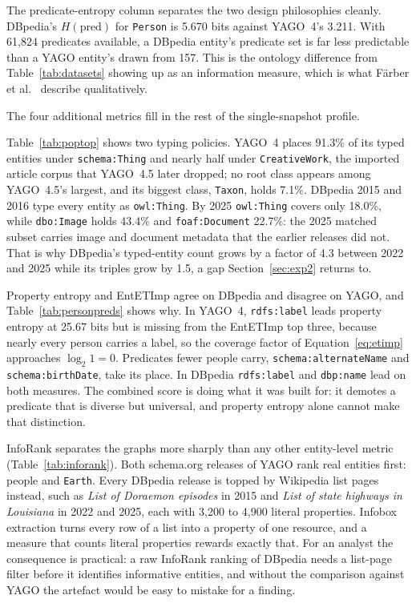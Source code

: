 The predicate-entropy column separates the two design philosophies cleanly.
DBpedia's $H(\text{pred})$ for \texttt{Person} is 5.670 bits against YAGO~4's
3.211. With 61{,}824 predicates available, a DBpedia entity's predicate set is
far less predictable than a YAGO entity's drawn from 157. This is the ontology
difference from Table~\ref{tab:datasets} showing up as an information measure,
which is what Färber et al.~\cite{farber2018linked} describe qualitatively.

The four additional metrics fill in the rest of the single-snapshot profile.

Table~\ref{tab:poptop} shows two typing policies. YAGO~4 places 91.3\% of its
typed entities under \texttt{schema:Thing} and nearly half under
\texttt{CreativeWork}, the imported article corpus that YAGO~4.5 later dropped;
no root class appears among YAGO~4.5's largest, and its biggest class,
\texttt{Taxon}, holds 7.1\%. DBpedia 2015 and 2016 type every entity as
\texttt{owl:Thing}. By 2025 \texttt{owl:Thing} covers only 18.0\%, while
\texttt{dbo:Image} holds 43.4\% and \texttt{foaf:Document} 22.7\%: the 2025
matched subset carries image and document metadata that the earlier releases did
not. That is why DBpedia's typed-entity count grows by a factor of 4.3 between
2022 and 2025 while its triples grow by 1.5, a gap Section~\ref{sec:exp2} returns
to.

Property entropy and EntETImp agree on DBpedia and disagree on YAGO, and
Table~\ref{tab:personpreds} shows why. In YAGO~4, \texttt{rdfs:label} leads
property entropy at 25.67 bits but is missing from the EntETImp top three,
because nearly every person carries a label, so the coverage factor of
Equation~\ref{eq:etimp} approaches $\log_2 1 = 0$. Predicates fewer people carry,
\texttt{schema:alternateName} and \texttt{schema:birthDate}, take its place. In
DBpedia \texttt{rdfs:label} and \texttt{dbp:name} lead on both measures. The
combined score is doing what it was built for: it demotes a predicate that is
diverse but universal, and property entropy alone cannot make that distinction.

InfoRank separates the graphs more sharply than any other entity-level metric
(Table~\ref{tab:inforank}). Both schema.org releases of YAGO rank real entities
first: people and \texttt{Earth}. Every DBpedia release is topped
by Wikipedia list pages instead, such as \emph{List of Doraemon episodes} in 2015
and \emph{List of state highways in Louisiana} in 2022 and 2025, each with 3{,}200
to 4{,}900 literal properties. Infobox extraction turns every row of a list into
a property of one resource, and a measure that counts literal properties rewards
exactly that. For an analyst the consequence is practical: a raw InfoRank ranking
of DBpedia needs a list-page filter before it identifies informative entities,
and without the comparison against YAGO the artefact would be easy to mistake
for a finding.

